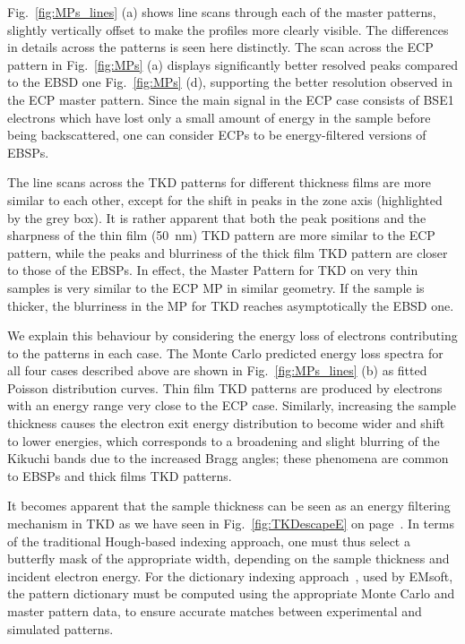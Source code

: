 Fig.~\ref{fig:MPs_lines} (a) shows line scans through each of the master patterns, slightly vertically offset to make the profiles more clearly visible. The differences in details across the patterns is seen here distinctly. The scan across the ECP pattern in Fig.~\ref{fig:MPs} (a) displays significantly better resolved peaks compared to the EBSD one Fig.~\ref{fig:MPs} (d), supporting the better resolution observed in the ECP master pattern. Since the main signal in the ECP case consists of BSE1 electrons which have lost only a small amount of energy in the sample before being backscattered, one can consider ECPs to be energy-filtered versions of EBSPs. 


The line scans across the TKD patterns for different thickness films are more similar to each other, except for the shift in peaks in the zone axis (highlighted by the grey box). It is rather apparent that both the peak positions and the sharpness of the thin film (50~nm) TKD pattern are more similar to the ECP pattern, while the peaks and blurriness of the thick film TKD pattern are closer to those of the EBSPs. In effect, the Master Pattern for TKD on very thin samples is very similar to the ECP MP in similar geometry. If the sample is thicker, the blurriness in the MP for TKD reaches asymptotically the EBSD one. 

We explain this behaviour by considering the energy loss of electrons contributing to the patterns in each case. The Monte Carlo predicted energy loss spectra for all four cases described above are shown in Fig.~\ref{fig:MPs_lines} (b) as fitted Poisson distribution curves. Thin film TKD patterns are produced by electrons with an energy range very close to the ECP case. Similarly, increasing the sample thickness causes the electron exit energy distribution to become wider and shift to lower energies, which corresponds to a broadening and slight blurring of the Kikuchi bands due to the increased Bragg angles; these phenomena are common to EBSPs and thick films TKD patterns. 


It becomes apparent that the sample thickness can be seen as an energy filtering mechanism in TKD as we have seen in Fig.~\ref{fig:TKDescapeE} on page~\pageref{fig:TKDescapeE}. In terms of the traditional Hough-based indexing approach, one must thus select a butterfly mask of the appropriate width, depending on the sample thickness and incident electron energy. For the dictionary indexing approach~\cite{Marquardt17}, used by EMsoft, the pattern dictionary must be computed using the appropriate Monte Carlo and master pattern data, to ensure accurate matches between experimental and simulated patterns.



